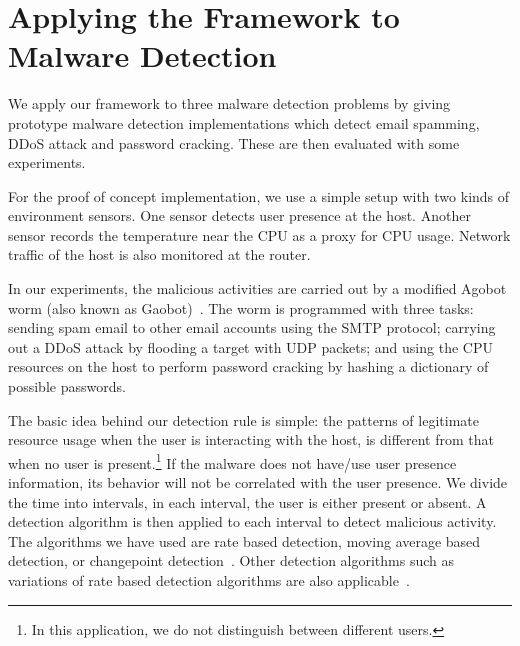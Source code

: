 \section{Applying the Framework to Malware Detection} \label{sec:app-malware}

We apply our framework to three malware detection problems
by giving prototype malware detection implementations which
detect email spamming, DDoS attack and password cracking.
These are then evaluated with some experiments.

For the proof of concept implementation, we use
a simple setup with two kinds of environment sensors.
One sensor detects user presence at the host.
Another sensor records the temperature near the CPU as a proxy
for CPU usage.
Network traffic of the host is also monitored at the router.

In our experiments, the malicious activities are carried out by a
modified Agobot worm (also known as Gaobot)~\cite{schiller2007infosecurity}.
The worm is programmed with three tasks:
sending spam email to other email accounts using the SMTP protocol; 
carrying out a DDoS attack by flooding a target with UDP packets; 
and using the CPU resources on the host to perform password
cracking by hashing a dictionary of possible passwords.

The basic idea behind our detection rule is simple: the patterns of
legitimate resource usage when the user is  interacting with the
host, is different from that when no user is present.\footnote{
In this application, we do not distinguish between different users.
}
If the malware does not have/use user presence information, 
its behavior will not be correlated with the user presence. 
We divide the time into
intervals, in each interval, the user is either present or absent.
A detection algorithm is then applied to each interval to detect
malicious activity. The algorithms we have used are rate based detection,
moving average based detection, or changepoint
detection~\cite{wang2002detecting,basseville1993detection}. 
Other detection algorithms such as 
variations of rate based detection algorithms are also applicable~\cite{chandola2009anomaly}.
